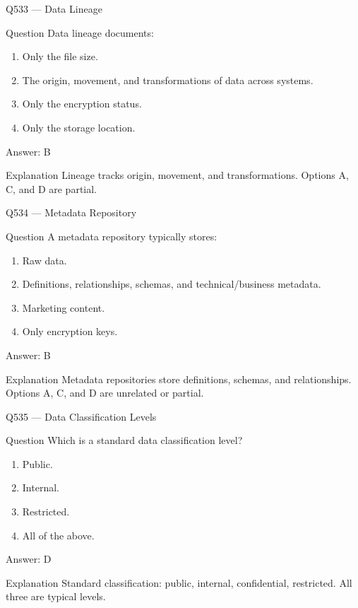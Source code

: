 \documentclass[aspectratio=169,8pt]{beamer}
\begin{document}
	\begin{frame}{Q533 --- Data Lineage}
		\begin{block}{Question}
			Data lineage documents:
			\begin{enumerate}
				\item Only the file size.
				\item The origin, movement, and transformations of data across systems.
				\item Only the encryption status.
				\item Only the storage location.
			\end{enumerate}
		\end{block}
		\begin{exampleblock}{Answer: B}\end{exampleblock}
		\begin{block}{Explanation}
			Lineage tracks origin, movement, and transformations. Options A, C, and D are partial.
		\end{block}
	\end{frame}
	
	\begin{frame}{Q534 --- Metadata Repository}
		\begin{block}{Question}
			A metadata repository typically stores:
			\begin{enumerate}
				\item Raw data.
				\item Definitions, relationships, schemas, and technical/business metadata.
				\item Marketing content.
				\item Only encryption keys.
			\end{enumerate}
		\end{block}
		\begin{exampleblock}{Answer: B}\end{exampleblock}
		\begin{block}{Explanation}
			Metadata repositories store definitions, schemas, and relationships. Options A, C, and D are unrelated or partial.
		\end{block}
	\end{frame}
	
	\begin{frame}{Q535 --- Data Classification Levels}
		\begin{block}{Question}
			Which is a standard data classification level?
			\begin{enumerate}
				\item Public.
				\item Internal.
				\item Restricted.
				\item All of the above.
			\end{enumerate}
		\end{block}
		\begin{exampleblock}{Answer: D}\end{exampleblock}
		\begin{block}{Explanation}
			Standard classification: public, internal, confidential, restricted. All three are typical levels.
		\end{block}
	\end{frame}
	
\end{document}
